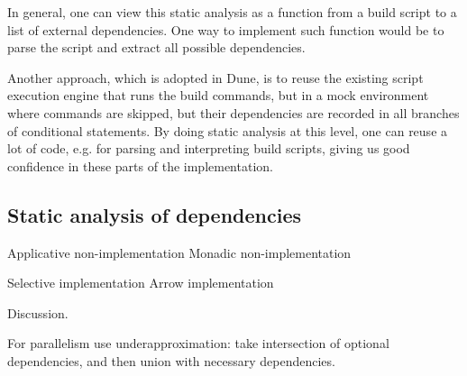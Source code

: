 In general, one can view this static analysis as a function from a build script
to a list of external dependencies. One way to implement such function would be
to parse the script and extract all possible dependencies.

Another approach, which is adopted in Dune, is to reuse the existing script
execution engine that runs the build commands, but in a mock environment where
commands are skipped, but their dependencies are recorded in all branches of
conditional statements. By doing static analysis at this level, one can reuse
a lot of code, e.g. for parsing and interpreting build scripts, giving us good
confidence in these parts of the implementation.

\subsection{Static analysis of dependencies}

Applicative non-implementation
Monadic non-implementation

Selective implementation
Arrow implementation

Discussion.

For parallelism use underapproximation: take intersection of optional
dependencies, and then union with necessary dependencies.
